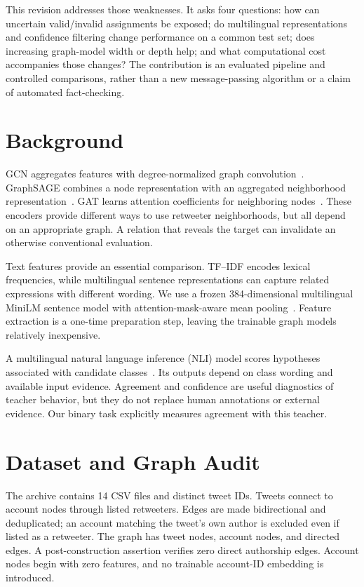 \documentclass[conference]{IEEEtran}
\begin{document}
This revision addresses those weaknesses. It asks four questions: how can uncertain valid/invalid assignments be exposed; do multilingual representations and confidence filtering change performance on a common test set; does increasing graph-model width or depth help; and what computational cost accompanies those changes? The contribution is an evaluated pipeline and controlled comparisons, rather than a new message-passing algorithm or a claim of automated fact-checking.

\section{Background}
GCN aggregates features with degree-normalized graph convolution~\cite{kipf2017}. GraphSAGE combines a node representation with an aggregated neighborhood representation~\cite{hamilton2017}. GAT learns attention coefficients for neighboring nodes~\cite{velickovic2018}. These encoders provide different ways to use retweeter neighborhoods, but all depend on an appropriate graph. A relation that reveals the target can invalidate an otherwise conventional evaluation.

Text features provide an essential comparison. TF--IDF encodes lexical frequencies, while multilingual sentence representations can capture related expressions with different wording. We use a frozen 384-dimensional multilingual MiniLM sentence model with attention-mask-aware mean pooling~\cite{minilm}. Feature extraction is a one-time preparation step, leaving the trainable graph models relatively inexpensive.

A multilingual natural language inference (NLI) model scores hypotheses associated with candidate classes~\cite{laurer}. Its outputs depend on class wording and available input evidence. Agreement and confidence are useful diagnostics of teacher behavior, but they do not replace human annotations or external evidence. Our binary task explicitly measures agreement with this teacher.

\section{Dataset and Graph Audit}
The archive contains 14 CSV files and \NumTweets{} distinct tweet IDs. Tweets connect to account nodes through listed retweeters. Edges are made bidirectional and deduplicated; an account matching the tweet's own author is excluded even if listed as a retweeter. The graph has \NumTweets{} tweet nodes, \NumAccounts{} account nodes, and \NumEdges{} directed edges. A post-construction assertion verifies zero direct authorship edges. Account nodes begin with zero features, and no trainable account-ID embedding is introduced.
\end{document}
